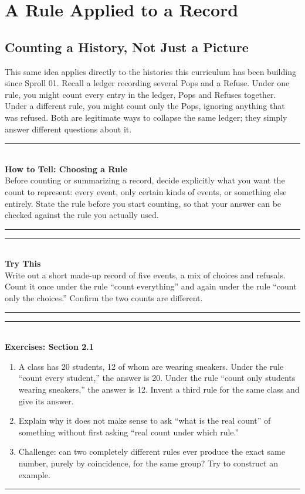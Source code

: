 \documentclass[11pt]{book}
\newenvironment{algorithmproc}[1]{\vspace{0.6em}\noindent\rule{\linewidth}{0.6pt}\\[0.2em]\textbf{How to Tell: #1}\\[0.3em]}{\\[0.2em]\noindent\rule{\linewidth}{0.6pt}\vspace{0.6em}}
\newenvironment{exercisebox}[1]{\vspace{0.8em}\noindent\rule{\linewidth}{0.6pt}\\[0.2em]\textbf{Exercises: #1}\\[0.3em]\begin{enumerate}[label=\arabic*., itemsep=0.4em]}{\end{enumerate}\noindent\rule{\linewidth}{0.6pt}\vspace{0.6em}}
\newenvironment{trythis}{\vspace{0.6em}\noindent\rule{\linewidth}{0.6pt}\\[0.2em]\textbf{Try This}\\[0.3em]}{\\[0.2em]\noindent\rule{\linewidth}{0.6pt}\vspace{0.6em}}
\begin{document}
\chapter{A Rule Applied to a Record}

\section{Counting a History, Not Just a Picture}

This same idea applies directly to the histories this curriculum has been building since Sproll 01. Recall a ledger recording several Pops and a Refuse. Under one rule, you might count every entry in the ledger, Pops and Refuses together. Under a different rule, you might count only the Pops, ignoring anything that was refused. Both are legitimate ways to collapse the same ledger; they simply answer different questions about it.

\begin{algorithmproc}{Choosing a Rule}
Before counting or summarizing a record, decide explicitly what you want the count to represent: every event, only certain kinds of events, or something else entirely. State the rule before you start counting, so that your answer can be checked against the rule you actually used.
\end{algorithmproc}

\begin{trythis}
Write out a short made-up record of five events, a mix of choices and refusals. Count it once under the rule ``count everything'' and again under the rule ``count only the choices.'' Confirm the two counts are different.
\end{trythis}

\begin{exercisebox}{Section 2.1}
\item A class has 20 students, 12 of whom are wearing sneakers. Under the rule ``count every student,'' the answer is 20. Under the rule ``count only students wearing sneakers,'' the answer is 12. Invent a third rule for the same class and give its answer.
\item Explain why it does not make sense to ask ``what is the real count'' of something without first asking ``real count under which rule.''
\item Challenge: can two completely different rules ever produce the exact same number, purely by coincidence, for the same group? Try to construct an example.
\end{exercisebox}
\end{document}
